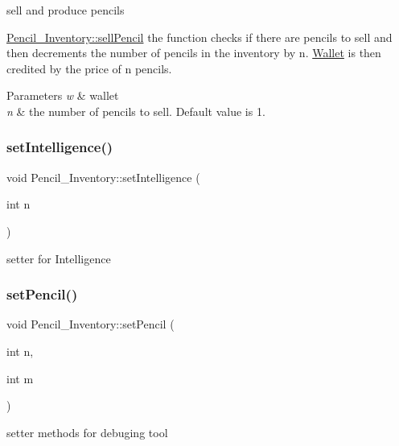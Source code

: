 sell and produce pencils 

\mbox{\hyperlink{classPencil__Inventory_a1ed4fd3f13785ba2a93c9f4045a5cbc7}{Pencil\+\_\+\+Inventory\+::sell\+Pencil}} the function checks if there are pencils to sell and then decrements the number of pencils in the inventory by n. \mbox{\hyperlink{classWallet}{Wallet}} is then credited by the price of n pencils.


\begin{DoxyParams}{Parameters}
{\em w} & wallet \\
\hline
{\em n} & the number of pencils to sell. Default value is 1. \\
\hline
\end{DoxyParams}
\mbox{\label{classPencil__Inventory_a76b13decdc0fafbf894b853da7d20321}} 
\subsubsection{\texorpdfstring{setIntelligence()}{setIntelligence()}}
{\footnotesize\ttfamily void Pencil\+\_\+\+Inventory\+::set\+Intelligence (\begin{DoxyParamCaption}\item[{int}]{n }\end{DoxyParamCaption})}



setter for Intelligence 

\mbox{\label{classPencil__Inventory_a599c6cab8ddaefc18a4113669b21f7d6}} 
\subsubsection{\texorpdfstring{setPencil()}{setPencil()}}
{\footnotesize\ttfamily void Pencil\+\_\+\+Inventory\+::set\+Pencil (\begin{DoxyParamCaption}\item[{int}]{n,  }\item[{int}]{m }\end{DoxyParamCaption})}



setter methods for debuging tool 


